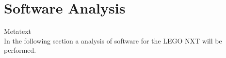 \newpage
\section{Software Analysis}
Metatext
\\
In the following section a analysis of software for the LEGO NXT will be performed.

